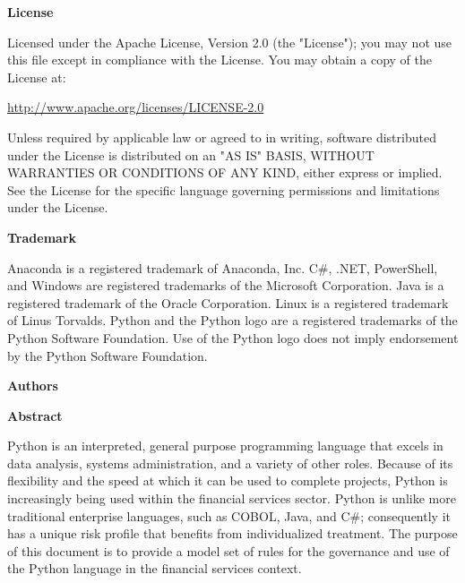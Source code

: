 \thispagestyle{empty}

\COPYRIGHT

\textbf{License}

Licensed under the Apache License, Version 2.0 (the "License"); you may not use this file except in compliance with the License. You may obtain a copy of the License at:

\url{http://www.apache.org/licenses/LICENSE-2.0}

Unless required by applicable law or agreed to in writing, software distributed under the License is distributed on an "AS IS" BASIS, WITHOUT WARRANTIES OR CONDITIONS OF ANY KIND, either express or implied. See the License for the specific language governing permissions and limitations under the License.

\textbf{Trademark}

Anaconda is a registered trademark of Anaconda, Inc. C\#, .NET, PowerShell, and Windows are registered trademarks of the Microsoft Corporation. Java is a registered trademark of the Oracle Corporation. Linux is a registered trademark of Linus Torvalds. Python and the Python logo are a registered trademarks of the Python Software Foundation. Use of the Python logo does not imply endorsement by the Python Software Foundation.

\textbf{Authors}

\AUTHORS

\textbf{Abstract}

Python is an interpreted, general purpose programming language that excels in data analysis, systems administration, and a variety of other roles. Because of its flexibility and the speed at which it can be used to complete projects, Python is increasingly being used within the financial services sector. Python is unlike more traditional enterprise languages, such as COBOL, Java, and C\#; consequently it has a unique risk profile that benefits from individualized treatment. The purpose of this document is to provide a model set of rules for the governance and use of the Python language in the financial services context.
